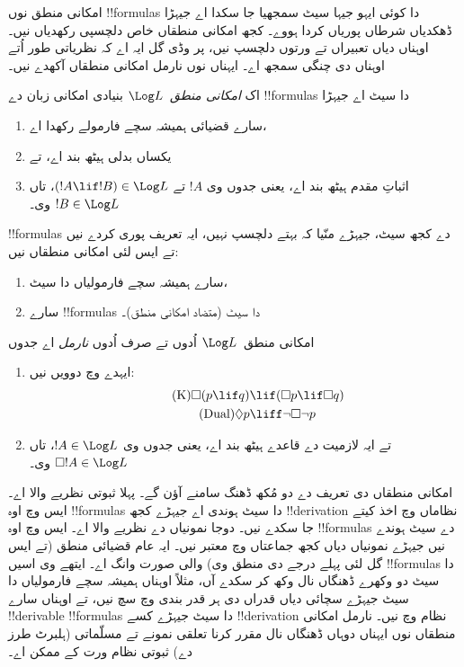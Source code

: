 \documentclass[../../../include/open-logic-section]{subfiles}
\begin{document}


امکانی منطق نوں !!{formula}s دا کوئی ایہو جیہا سیٹ سمجھیا جا سکدا اے جیہڑا ڈھکدیاں شرطاں پوریاں کردا ہووے۔ کجھ امکانی منطقاں خاص دلچسپی رکھدیاں نیں۔ اوہناں دیاں تعبیراں تے ورتوں دلچسپ نیں، پر وڈی گل ایہ اے کہ نظریاتی طور اُتے اوہناں دی چنگی سمجھ اے۔ ایہناں نوں نارمل امکانی منطقاں آکھدے نیں۔

\begin{defn}
اک \emph{امکانی منطق}~$\Log L$ بنیادی امکانی زبان دے !!{formula}s دا سیٹ اے جیہڑا
\begin{enumerate}
\item سارے قضیائی ہمیشہ سچے فارمولے رکھدا اے،
\item یکساں بدلی ہیٹھ بند اے، تے
\item اثباتِ مقدم ہیٹھ بند اے، یعنی جدوں وی $!A$ تے $(!A \lif
  !B) \in \Log L$، تاں $!B \in \Log L$ وی۔
\end{enumerate}
\end{defn}

\begin{ex}
!!{formula}s دے کجھ سیٹ، جیہڑے منّیا کہ بہتے دلچسپ نہیں، ایہ تعریف پوری کردے نیں تے ایس لئی امکانی منطقاں نیں:
\begin{enumerate}
\item سارے ہمیشہ سچے فارمولیاں دا سیٹ،
\item سارے !!{formula}s دا سیٹ (متضاد امکانی منطق)۔
\end{enumerate}
\end{ex}

\begin{defn}\label{defn:normal-modal-logic}
امکانی منطق~$\Log L$ اُدوں تے صرف اُدوں \emph{نارمل} اے جدوں
\begin{enumerate}
\item ایہدے وچ دوویں نیں:
\begin{align}
\tag{K} \Box(p \lif q) & \lif (\Box p \lif \Box q) \\
\tag{Dual} \Diamond p & \liff \lnot \Box \lnot p
\end{align}
\item تے ایہ لازمیت دے قاعدے ہیٹھ بند اے، یعنی جدوں وی $!A \in
  \Log L$، تاں $\Box !A \in \Log L$ وی۔
\end{enumerate}
\end{defn}

امکانی منطقاں دی تعریف دے دو مُکھ ڈھنگ سامنے آؤن گے۔ پہلا ثبوتی نظریے والا اے۔ ایس وچ اوہ !!{formula}s دا سیٹ ہوندی اے جیہڑے کجھ !!{derivation} نظاماں وچ اخذ کیتے جا سکدے نیں۔ دوجا نمونیاں دے نظریے والا اے۔ ایس وچ اوہ !!{formula}s دے سیٹ ہوندے نیں جیہڑے نمونیاں دیاں کجھ جماعتاں وچ معتبر نیں۔ ایہ عام قضیائی منطق (تے ایس گل لئی پہلے درجے دی منطق وی) والی صورت وانگ اے۔ ایتھے وی اسیں !!{formula}s دا سیٹ دو وکھرے ڈھنگاں نال وکھ کر سکدے آں، مثلاً اوہناں ہمیشہ سچے فارمولیاں دا سیٹ جیہڑے سچائی دیاں قدراں دی ہر قدر بندی وچ سچ نیں، تے اوہناں سارے !!{derivable} !!{formula}s دا سیٹ جیہڑے کسے !!{derivation} نظام وچ نیں۔ نارمل امکانی منطقاں نوں ایہناں دوہاں ڈھنگاں نال مقرر کرنا تعلقی نمونے تے مسلّماتی (ہلبرٹ طرز دے) ثبوتی نظام ورت کے ممکن اے۔
\end{document}
